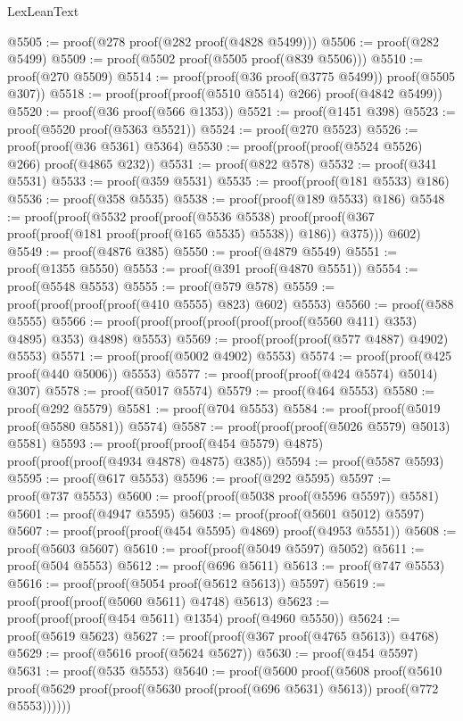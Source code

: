 \begin{lexlean}{LexLeanText}
\begin{coremodule}
@5505 := proof(@278 proof(@282 proof(@4828 @5499)))
@5506 := proof(@282 @5499)
@5509 := proof(@5502 proof(@5505 proof(@839 @5506)))
@5510 := proof(@270 @5509)
@5514 := proof(proof(@36 proof(@3775 @5499)) proof(@5505 @307))
@5518 := proof(proof(proof(@5510 @5514) @266) proof(@4842 @5499))
@5520 := proof(@36 proof(@566 @1353))
@5521 := proof(@1451 @398)
@5523 := proof(@5520 proof(@5363 @5521))
@5524 := proof(@270 @5523)
@5526 := proof(proof(@36 @5361) @5364)
@5530 := proof(proof(proof(@5524 @5526) @266) proof(@4865 @232))
@5531 := proof(@822 @578)
@5532 := proof(@341 @5531)
@5533 := proof(@359 @5531)
@5535 := proof(proof(@181 @5533) @186)
@5536 := proof(@358 @5535)
@5538 := proof(proof(@189 @5533) @186)
@5548 := proof(proof(@5532
        proof(proof(@5536 @5538)
            proof(proof(@367 proof(proof(@181 proof(proof(@165 @5535) @5538)) @186)) @375)))
      @602)
@5549 := proof(@4876 @385)
@5550 := proof(@4879 @5549)
@5551 := proof(@1355 @5550)
@5553 := proof(@391 proof(@4870 @5551))
@5554 := proof(@5548 @5553)
@5555 := proof(@579 @578)
@5559 := proof(proof(proof(proof(@410 @5555) @823) @602) @5553)
@5560 := proof(@588 @5555)
@5566 := proof(proof(proof(proof(proof(proof(@5560 @411) @353) @4895) @353) @4898) @5553)
@5569 := proof(proof(proof(@577 @4887) @4902) @5553)
@5571 := proof(proof(@5002 @4902) @5553)
@5574 := proof(proof(@425 proof(@440 @5006)) @5553)
@5577 := proof(proof(proof(@424 @5574) @5014) @307)
@5578 := proof(@5017 @5574)
@5579 := proof(@464 @5553)
@5580 := proof(@292 @5579)
@5581 := proof(@704 @5553)
@5584 := proof(proof(@5019 proof(@5580 @5581)) @5574)
@5587 := proof(proof(proof(@5026 @5579) @5013) @5581)
@5593 := proof(proof(proof(@454 @5579) @4875) proof(proof(proof(@4934 @4878) @4875) @385))
@5594 := proof(@5587 @5593)
@5595 := proof(@617 @5553)
@5596 := proof(@292 @5595)
@5597 := proof(@737 @5553)
@5600 := proof(proof(@5038 proof(@5596 @5597)) @5581)
@5601 := proof(@4947 @5595)
@5603 := proof(proof(@5601 @5012) @5597)
@5607 := proof(proof(proof(@454 @5595) @4869) proof(@4953 @5551))
@5608 := proof(@5603 @5607)
@5610 := proof(proof(@5049 @5597) @5052)
@5611 := proof(@504 @5553)
@5612 := proof(@696 @5611)
@5613 := proof(@747 @5553)
@5616 := proof(proof(@5054 proof(@5612 @5613)) @5597)
@5619 := proof(proof(proof(@5060 @5611) @4748) @5613)
@5623 := proof(proof(proof(@454 @5611) @1354) proof(@4960 @5550))
@5624 := proof(@5619 @5623)
@5627 := proof(proof(@367 proof(@4765 @5613)) @4768)
@5629 := proof(@5616 proof(@5624 @5627))
@5630 := proof(@454 @5597)
@5631 := proof(@535 @5553)
@5640 := proof(@5600
      proof(@5608
          proof(@5610
              proof(@5629 proof(proof(@5630 proof(proof(@696 @5631) @5613)) proof(@772 @5553))))))

\end{coremodule}
\end{lexlean}
